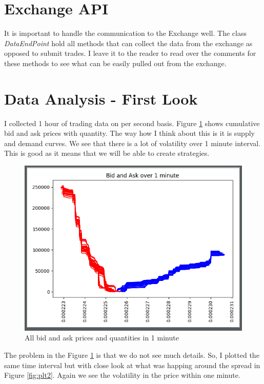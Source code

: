 \documentclass[12pt]{article}
\begin{document}
\section*{Exchange API}
It is important to handle the communication to the Exchange well. The class \textit{DataEndPoint} hold all methods that can collect the data from the exchange as opposed to submit trades. I leave it to the reader to read over the comments for these methods to see what can be easily pulled out from the exchange.

\section*{Data Analysis - First Look}
I collected 1 hour of trading data on per second basis. Figure \ref{fig:plt1} shows cumulative bid and ask prices with quantity. The way how I think about this is it is supply and demand curves. We see that there is a lot of volatility over 1 minute interval. This is good as it means that we will be able to create strategies.
\begin{figure}[h!]
	\centering
  \includegraphics[scale=0.5]{plot1.png}
  \caption{All bid and ask prices and quantities in 1 minute}
  \label{fig:plt1}
\end{figure}

The problem in the Figure \ref{fig:plt1} is that we do not see much details. So, I plotted the same time interval but with close look at what was happing around the spread in Figure \ref{fig:plt2}. Again we see the volatility in the price within one minute.
\end{document}
